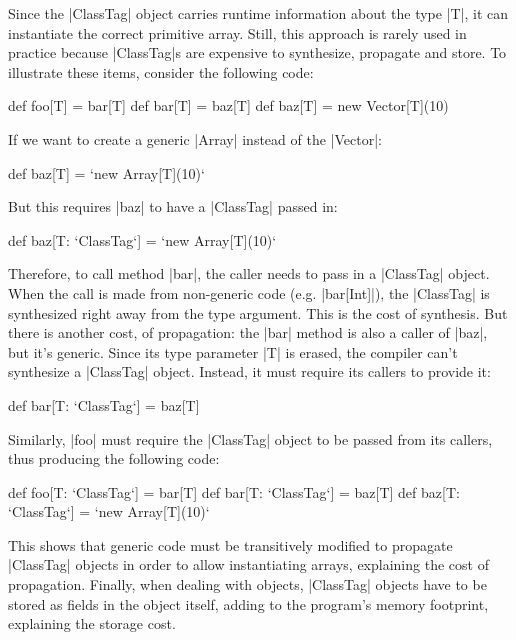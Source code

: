 Since the |ClassTag| object carries runtime information about the type |T|, it can instantiate the correct primitive array. Still, this approach is rarely used in practice because |ClassTag|s are expensive to synthesize, propagate and store.
To illustrate these items, consider the following code:

\begin{lstlisting-nobreak}
 def foo[T] = bar[T]
 def bar[T] = baz[T]
 def baz[T] = new Vector[T](10)
\end{lstlisting-nobreak}

If we want to create a generic |Array| instead of the |Vector|:

\begin{lstlisting-nobreak}
 def baz[T] = `new Array[T](10)`
\end{lstlisting-nobreak}

But this requires |baz| to have a |ClassTag| passed in:

\begin{lstlisting-nobreak}
 def baz[T: `ClassTag`] = `new Array[T](10)`
\end{lstlisting-nobreak}

Therefore, to call method |bar|, the caller needs to pass in a |ClassTag| object. When the call is made from non-generic code (e.g. |bar[Int]|), the |ClassTag| is synthesized right away from the type argument. This is the cost of synthesis. But there is another cost, of propagation: the |bar| method is also a caller of |baz|, but it's generic. Since its type parameter |T| is erased, the compiler can't synthesize a |ClassTag| object. Instead, it must require its callers to provide it:

\begin{lstlisting-nobreak}
 def bar[T: `ClassTag`] = baz[T]
\end{lstlisting-nobreak}

Similarly, |foo| must require the |ClassTag| object to be passed from its callers, thus producing the following code:

\begin{lstlisting-nobreak}
 def foo[T: `ClassTag`] = bar[T]
 def bar[T: `ClassTag`] = baz[T]
 def baz[T: `ClassTag`] = `new Array[T](10)`
\end{lstlisting-nobreak}

This shows that generic code must be transitively modified to propagate |ClassTag| objects in order to allow instantiating arrays, explaining the cost of propagation. Finally, when dealing with objects, |ClassTag| objects have to be stored as fields in the object itself, adding to the program's memory footprint, explaining the storage cost.

